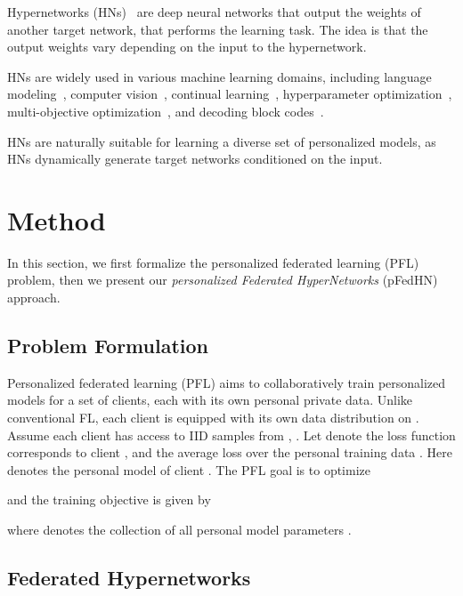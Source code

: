 \documentclass{article}
\newcommand\ourmethod{pFedHN}
\begin{document}
Hypernetworks (HNs)~\citep{Klein2015ADC, Riegler2015ConditionedRM, Ha2017HyperNetworks} are deep neural networks that output the weights of another target network, that performs the learning task. The idea is that the output weights vary depending on the input to the hypernetwork.

HNs are widely used in various machine learning domains, including language modeling~\citep{suarez2017character}, computer vision~\citep{Ha2017HyperNetworks, klocek2019hypernetwork}, continual learning~\citep{von2019continual}, hyperparameter optimization~\citep{Lorraine2018StochasticHO, MacKay2019SelfTuningNB, Bae2020DeltaSTNEB}, multi-objective optimization~\citep{navon2021learning}, and decoding block codes~\citep{DBLP:conf/nips/NachmaniW19}. 

HNs are naturally suitable for learning a diverse set of personalized models, as HNs dynamically generate target networks conditioned on the input. 
 
 
 
 \section{Method}\label{sec:model}
 


 
 In this section, we first formalize the personalized federated learning (PFL) problem, then we present our \textit{personalized Federated HyperNetworks} (\ourmethod{}) approach.
 
\subsection{Problem Formulation}
Personalized federated learning (PFL) aims to collaboratively train personalized models for a set of  clients, each with its own personal private data. Unlike conventional FL, each client  is equipped with its own data
distribution  on . Assume each client has access to  IID samples from , . Let  denote the loss function corresponds to client , and  the average loss over the personal training data . Here  denotes the personal model of client . The PFL goal is to optimize 

and the training objective is given by 

where  denotes the collection of all personal model parameters .

\subsection{Federated Hypernetworks}
\label{fhn}
\end{document}
